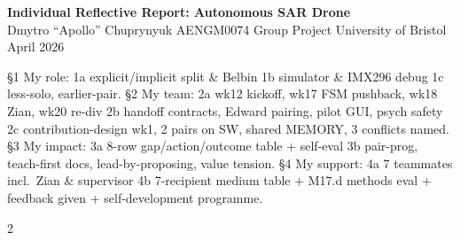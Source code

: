 \documentclass[11pt,a4paper]{article}
\begin{document}
\begin{center}
  {\large\bfseries Individual Reflective Report: Autonomous SAR Drone}\\[2pt]
  {\small Dmytro ``Apollo'' Chuprynyuk \textbar{} AENGM0074 Group Project \textbar{} University of Bristol \textbar{} April 2026}
\end{center}
\vspace{-4pt}

{\scriptsize\color{headblue}
\S1 My role: 1a explicit/implicit split \& Belbin \textbar{} 1b simulator \& IMX296 debug \textbar{} 1c less-solo, earlier-pair.
\S2 My team: 2a wk12 kickoff, wk17 FSM pushback, wk18 Zian, wk20 re-div \textbar{} 2b handoff contracts, Edward pairing, pilot GUI, psych safety \textbar{} 2c contribution-design wk1, 2 pairs on SW, shared MEMORY, 3 conflicts named.
\S3 My impact: 3a 8-row gap/action/outcome table + self-eval \textbar{} 3b pair-prog, teach-first docs, lead-by-proposing, value tension.
\S4 My support: 4a 7 teammates incl.\ Zian \& supervisor \textbar{} 4b 7-recipient medium table + M17.d methods eval + feedback given + self-development programme.
}\vspace{-2pt}






\begin{multicols}{2}
\printbibliography[heading=none]
\end{multicols}
\end{document}
